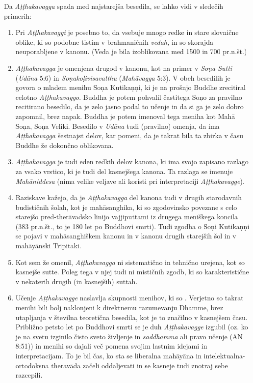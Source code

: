 Da \emph{Aṭṭhakavagga} spada med najstarejša besedila, se lahko vidi v
sledečih primerih:

\begin{enumerate}
\item
  Pri \emph{Aṭṭhakavaggi} je posebno to, da vsebuje mnogo redke in stare
  slovnične oblike, ki so podobne tistim v brahmaničnih \emph{vedah,} in
  so skorajda neuporabljene v kanonu. (Veda je bila izoblikovana med
  1500 in 700 pr.n.št.)
\item
  \emph{Aṭṭhakavagga} je omenjena drugod v kanonu, kot na primer v
  \emph{Soṇa Sutti} (\emph{Udāna} 5:6) in \emph{Soṇakoḷivisavatthu}
  (\emph{Mahāvagga} 5:3). V obeh besedilih je govora o mladem menihu
  Soṇa Kutikaṇṇi, ki je na prošnjo Buddhe zrecitiral celotno
  \emph{Aṭṭhakavaggo}. Buddha je potem pohvalil častitega Soṇo za
  pravilno recitirano besedilo, da je zelo jasno podal to učenje in da
  si ga je zelo dobro zapomnil, brez napak. Buddha je potem imenoval
  tega meniha kot Mahā Soṇa, Soṇa Veliki. Besedilo v \emph{Udāna} tudi
  (pravilno) omenja, da ima \emph{Aṭṭhakavagga} šestnajst delov, kar
  pomeni, da je takrat bila ta zbirka v času Buddhe že dokončno
  oblikovana.
\item
  \emph{Aṭṭhakavagga} je tudi eden redkih delov kanona, ki ima svojo
  zapisano razlago za vsako vrstico, ki je tudi del kasnejšega kanona.
  Ta razlaga se imenuje \emph{Mahāniddesa} (nima velike veljave ali
  koristi pri interpretaciji \emph{Aṭṭhakavagge}).
\item
  Raziskave kažejo, da je \emph{Aṭṭhakavagga} del kanona tudi v drugih
  starodavnih budističnih šolah, kot je mahāsanghika, ki so zgodovinsko
  povezane s celo starejšo pred-therāvadsko linijo vajjiputtami iz
  drugega meniškega koncila (383 pr.n.št., to je 180 let po Buddhovi
  smrti). Tudi zgodba o Soṇi Kutikaṇṇi se pojavi v mahāsanghiškem kanonu
  in v kanonu drugih starejših šol in v mahāyānski Tripitaki.
\item
  Kot sem že omenil, \emph{Aṭṭhakavagga} ni sistematično in tehnično
  urejena, kot so kasnejše sutte. Poleg tega v njej tudi ni mističnih
  zgodb, ki so karakteristične v nekaterih drugih (in kasnejših) suttah.
\item
  Učenje \emph{Aṭṭhakavagge} naslavlja skupnosti menihov, ki so .
  Verjetno so takrat menihi bili bolj naklonjeni k direktnemu
  razumevanju Dhamme, brez utapljanja v številna teoretična besedila,
  kot je to značilno v kasnejšem času. Približno petsto let po Buddhovi
  smrti se je duh \emph{Aṭṭhakavagge} izgubil (oz. ko je na svetu
  izginilo čisto sveto življenje in \emph{saddhamma} ali pravo učenje
  (AN 8:51)) in menihi so dajali več pomena svojim lastnim idejami in
  interpretacijam. To je bil čas, ko sta se liberalna mahāyāna in
  intelektualna-ortodoksna theravāda začeli oddaljevati in se kasneje
  tudi znotraj sebe razcepili.
\end{enumerate}

